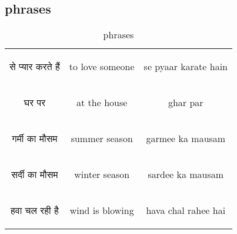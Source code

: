 \newpage
\subsection{phrases}
\begin{table}[H]
    \centering
    \begin{tabular}{c|c|c}
    \begin{hindi} से प्यार करते हैं \end{hindi} & to love someone & se pyaar karate hain \\    
    \begin{hindi} घर पर \end{hindi} & at the house & ghar par \\    
    \begin{hindi}  गर्मी का मौसम  \end{hindi} & summer season & garmee ka mausam \\    
    \begin{hindi}  सर्दी का मौसम  \end{hindi} & winter season & sardee ka mausam \\    
    \begin{hindi}  हवा चल रही है  \end{hindi} & wind is blowing & hava chal rahee hai \\    
    \end{tabular}
    \caption{phrases}    
    \label{tab:phrases}
\end{table}



